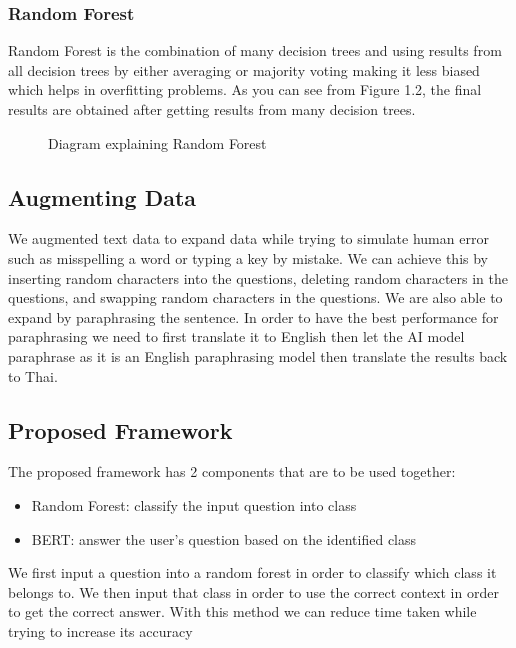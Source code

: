 \documentclass[12pt,oneside,openright,a4paper]{cpe-english-project}
\begin{document}
        \subsubsection{Random Forest}
          \qquad Random Forest is the combination of many decision trees and using results from all decision trees by either averaging or majority voting making it less biased which helps in overfitting problems. As you can see from Figure 1.2, the final results are obtained after getting results from many decision trees.\par
          \begin{figure}[!h]
            \centering
            \caption{Diagram explaining Random Forest}\label{fig:Random_Forest}
          \end{figure}
    \subsection{Augmenting Data}
      \qquad We augmented text data to expand data while trying to simulate human error such as misspelling a word or typing a key by mistake. We can achieve this by inserting random characters into the questions, deleting random characters in the questions, and swapping random characters in the questions. We are also able to expand by paraphrasing the sentence. In order to have the best performance for paraphrasing we need to first translate it to English then let the AI model paraphrase as it is an English paraphrasing model then translate the results back to Thai.\par
    \subsection{Proposed Framework}
      \qquad The proposed framework has 2 components that are to be used together:\par
      \begin{itemize}
        \item Random Forest: classify the input question into class
        \item BERT: answer the user's question based on the identified class
      \end{itemize}
      \qquad We first input a question into a random forest in order to classify which class it belongs to. We then input that class in order to use the correct context in order to get the correct answer. With this method we can reduce time taken while trying to increase its accuracy\par
\end{document}
